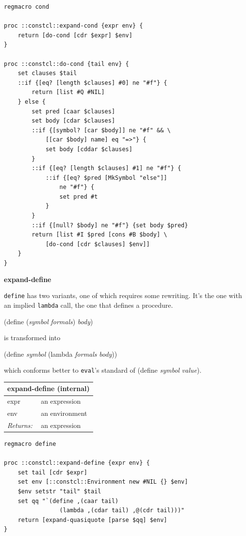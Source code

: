 \documentclass[twoside,9pt]{report}
\begin{document}
\noindent\makebox[\linewidth]{\rule{\linewidth}{0.4pt}}
\begin{lstlisting}
regmacro cond
 
proc ::constcl::expand-cond {expr env} {
    return [do-cond [cdr $expr] $env]
}
 
proc ::constcl::do-cond {tail env} {
    set clauses $tail
    ::if {[eq? [length $clauses] #0] ne "#f"} {
        return [list #Q #NIL]
    } else {
        set pred [caar $clauses]
        set body [cdar $clauses]
        ::if {[symbol? [car $body]] ne "#f" && \
            [[car $body] name] eq "=>"} {
            set body [cddar $clauses]
        }
        ::if {[eq? [length $clauses] #1] ne "#f"} {
            ::if {[eq? $pred [MkSymbol "else"]]
                ne "#f"} {
                set pred #t
            }
        }
        ::if {[null? $body] ne "#f"} {set body $pred}
        return [list #I $pred [cons #B $body] \
            [do-cond [cdr $clauses] $env]]
    }
}
\end{lstlisting}
\noindent\makebox[\linewidth]{\rule{\linewidth}{0.4pt}}

\textbf{expand-define}


\texttt{define} has two variants, one of which requires some rewriting. It's the one with an implied \texttt{lambda} call, the one that defines a procedure.


(define (\emph{symbol} \emph{formals}) \emph{body})


is transformed into


(define \emph{symbol} (lambda \emph{formals} \emph{body}))


which conforms better to \texttt{eval}'s standard of (define \emph{symbol} \emph{value}).

\begin{tabular}{ |l l| }
\hline
\multicolumn{2}{|l|}{expand-define (internal)} \\
\hline
expr & an expression \\
env & an environment \\
\textit{Returns:} & an expression \\
\hline
\end{tabular}

\noindent\makebox[\linewidth]{\rule{\linewidth}{0.4pt}}
\begin{lstlisting}
regmacro define
 
proc ::constcl::expand-define {expr env} {
    set tail [cdr $expr]
    set env [::constcl::Environment new #NIL {} $env]
    $env setstr "tail" $tail
    set qq "`(define ,(caar tail)
                (lambda ,(cdar tail) ,@(cdr tail)))"
    return [expand-quasiquote [parse $qq] $env]
}
\end{lstlisting}
\noindent\makebox[\linewidth]{\rule{\linewidth}{0.4pt}}
\end{document}
